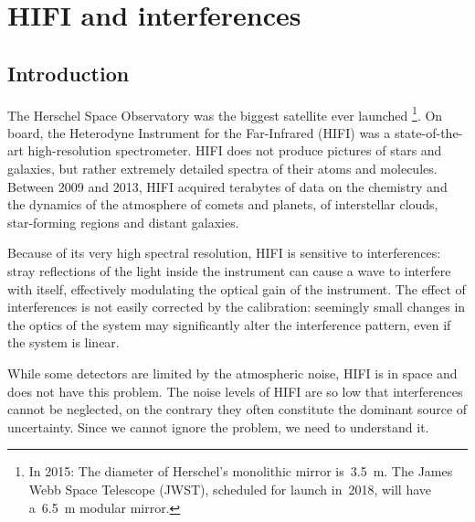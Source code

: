 \cleardoublepage
\chapter{HIFI and interferences}
\label{sec:chapter1}

\section{Introduction}
The Herschel Space Observatory was the biggest satellite ever launched%
\footnote{
    In 2015: The diameter of Herschel's monolithic mirror is~\SI{3.5}{\meter}.  The James Webb Space Telescope (JWST), scheduled for launch in~2018, will have a~\SI{6.5}{\meter} modular mirror.
}.
On board, the Heterodyne Instrument for the Far-Infrared (HIFI) was a state-of-the-art high-resolution spectrometer.
HIFI does not produce pictures of stars and galaxies, but rather extremely detailed spectra of their atoms and molecules.
Between 2009 and 2013, HIFI acquired terabytes of data on the chemistry and the dynamics of the atmosphere of comets and planets, of interstellar clouds, star-forming regions and distant galaxies.

Because of its very high spectral resolution, HIFI is sensitive to interferences:
stray reflections of the light inside the instrument can cause a wave to interfere with itself, effectively modulating the optical gain of the instrument.
The effect of interferences is not easily corrected by the calibration:
seemingly small changes in the optics of the system may significantly alter the interference pattern, even if the system is linear.

While some detectors are limited by the atmospheric noise, HIFI is in space and does not have this problem.
The noise levels of HIFI are so low that interferences cannot be neglected,
on the contrary they often constitute the dominant source of uncertainty.
Since we cannot ignore the problem, we need to understand it.



